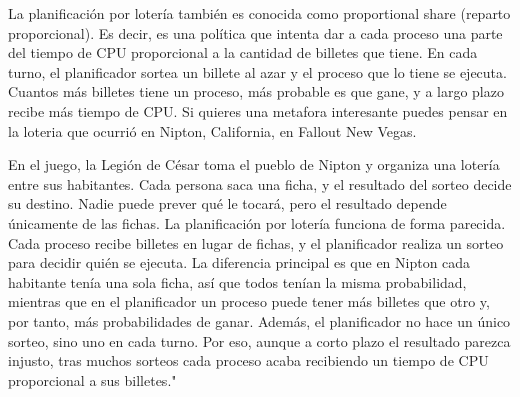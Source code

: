 La planificación por lotería también es conocida como proportional share
(reparto proporcional). Es decir, es una política que intenta dar a cada proceso una parte del tiempo de CPU proporcional a la cantidad de billetes que tiene. En cada turno, el planificador sortea un billete al azar y el proceso que lo tiene se ejecuta. Cuantos más billetes
tiene un proceso, más probable es que gane, y a largo plazo recibe más tiempo de CPU.
Si quieres una metafora interesante puedes pensar en la loteria que ocurrió en Nipton, California,
en Fallout New Vegas.

En el juego, la Legión de César toma el pueblo de Nipton y organiza una lotería entre sus habitantes. Cada persona saca una ficha, y el resultado del sorteo decide su destino. Nadie puede prever qué le tocará, pero el resultado depende únicamente de las fichas. La planificación por lotería funciona de forma parecida. Cada proceso recibe billetes en lugar de fichas, y el planificador realiza un sorteo para decidir quién se ejecuta. La diferencia principal es que en Nipton cada habitante tenía una sola ficha, así que todos tenían la misma probabilidad, mientras que en el planificador un proceso puede tener más billetes que otro y, por tanto, más probabilidades de ganar. Además, el planificador no hace un único sorteo, sino uno en cada turno. Por eso, aunque a corto plazo el resultado parezca injusto, tras muchos sorteos cada proceso acaba recibiendo un tiempo de CPU proporcional a sus billetes."
